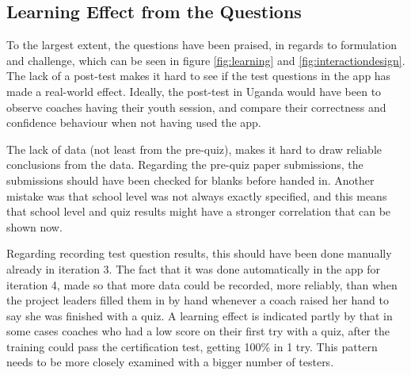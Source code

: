   \subsection{Learning Effect from the Questions}
  To the largest extent, the questions have been praised, in regards to formulation and challenge, which can be seen in figure \ref{fig:learning} and \ref{fig:interactiondesign}. The lack of a post-test makes it hard to see if the test questions in the app has made a real-world effect. Ideally, the post-test in Uganda would have been to observe coaches having their youth session, and compare their correctness and confidence behaviour when not having used the app. %

  The lack of data (not least from the pre-quiz), makes it hard to draw reliable conclusions from the data. Regarding the pre-quiz paper submissions, the submissions should have been checked for blanks before handed in. Another mistake was that school level was not always exactly specified, and this means that school level and quiz results might have a stronger correlation that can be shown now.

  Regarding recording test question results, this should have been done manually already in iteration 3. The fact that it was done automatically in the app for iteration 4, made so that more data could be recorded, more reliably, than when the project leaders filled them in by hand whenever a coach raised her hand to say she was finished with a quiz. A learning effect is indicated partly by that in some cases coaches who had a low score on their first try with a quiz, after the training could pass the certification test, getting 100\% in 1 try. This pattern needs to be more closely examined with a bigger number of testers.
